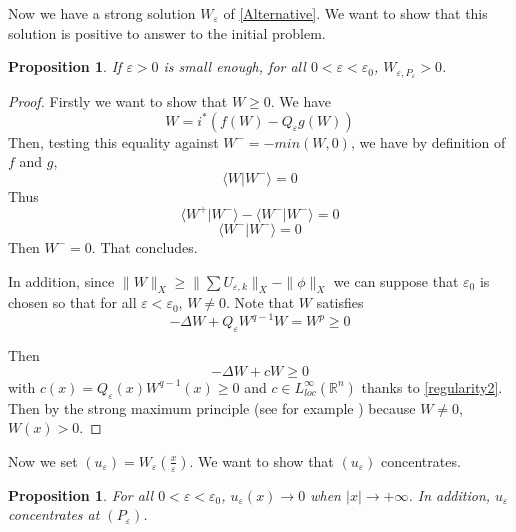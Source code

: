 \documentclass[12pt]{amsart}
\theoremstyle{plain}
\newtheorem{proposition}[theorem]{Proposition}
\theoremstyle{definition}
\theoremstyle{remark}
\renewcommand{\epsilon}{\varepsilon}
\begin{document}
Now we have a strong solution $W_{\epsilon}$ of \eqref{Alternative}. We want to show that this solution is positive to answer to the initial problem. 


\begin{proposition}\label{positivity}
    If $\epsilon >0$ is small enough, for all $0<\epsilon <\epsilon_0$, $W_{\epsilon,P_{\epsilon}}>0$.
    
\end{proposition}


\begin{proof}
Firstly we want to show that $W\geq 0$.
We have
$$W=i^*(f(W)-Q_{\epsilon}g(W))$$
Then, testing this equality against $W^-=-min(W,0)$, we have by definition of $f$ and $g$,
$$\langle W|W^- \rangle =0 $$
Thus $$\langle W^+|W^- \rangle-\langle W^-|W^- \rangle =0$$
$$ \langle W^-|W^- \rangle =0$$
Then $W^-=0$.
That concludes.

In addition, since $\|W\|_X \geq \|\sum U_{\epsilon,k}\|_X-\|\phi\|_X$ we can suppose that $\epsilon_0$ is chosen so that for all $\epsilon<\epsilon_0$, $W\ne0$. Note that $W$ satisfies $$-\Delta W +Q_{\epsilon}W^{q-1}W=W^p \geq 0$$

Then $$-\Delta W +cW \geq 0$$
with $c(x)=Q_{\epsilon}(x)W^{q-1}(x)\geq 0$ and $c \in L^\infty_{loc}(\mathbb{R}^n)$ thanks to \ref{regularity2}. Then by the strong maximum principle (see for example \cite{Evans2010}) because $W\ne 0$, $W(x)>0$. 

\end{proof}

Now we set $(u_{\epsilon})=W_{\epsilon}(\frac{x}{\epsilon})$. We want to show that $(u_\epsilon)$ concentrates. 
\begin{proposition}\label{regularity}
For all $0<\epsilon <\epsilon_0$, $u_{\epsilon}(x) \rightarrow0$ when $|x|\rightarrow +\infty$. 
In addition, $u_{\epsilon}$ concentrates at $(P_{\epsilon})$.


\end{proposition}
\end{document}
